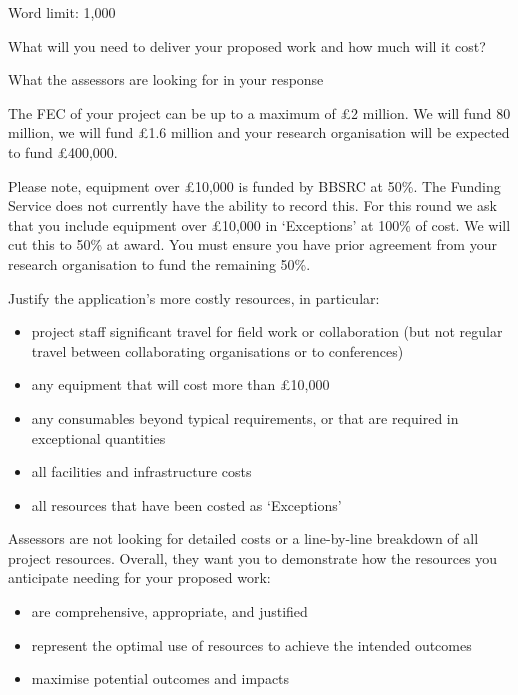 \documentclass[12pt]{article}
\newenvironment{instruction}{\par\color{red}}{\par}
\begin{document}
\begin{instruction}

Word limit: 1,000

What will you need to deliver your proposed work and how much will it cost?

What the assessors are looking for in your response

The FEC of your project can be up to a maximum of £2 million. We will fund
80%
million, we will fund £1.6 million and your research organisation will be
expected to fund £400,000.

Please note, equipment over £10,000 is funded by BBSRC at 50\%. The
Funding Service does not currently have the ability to record this. For this round
we ask that you include equipment over £10,000 in ‘Exceptions’ at 100\% of
cost. We will cut this to 50\% at award. You must ensure you have prior
agreement from your research organisation to fund the remaining 50\%.

Justify the application’s more costly resources, in particular:

\begin{itemize}

	\item project staff significant travel for field work or collaboration (but
not regular travel between collaborating organisations or to conferences)

	\item any equipment that will cost more than £10,000

	\item any consumables beyond typical requirements, or that are required in
exceptional quantities

	\item all facilities and infrastructure costs

	\item all resources that have been costed as ‘Exceptions’

\end{itemize}

Assessors are not looking for detailed costs or a line-by-line breakdown of all
project resources. Overall, they want you to demonstrate how the resources
you anticipate needing for your proposed work:

\begin{itemize}

	\item are comprehensive, appropriate, and justified

	\item represent the optimal use of resources to achieve the intended
outcomes

	\item maximise potential outcomes and impacts

\end{itemize}

\end{instruction}
\end{document}
